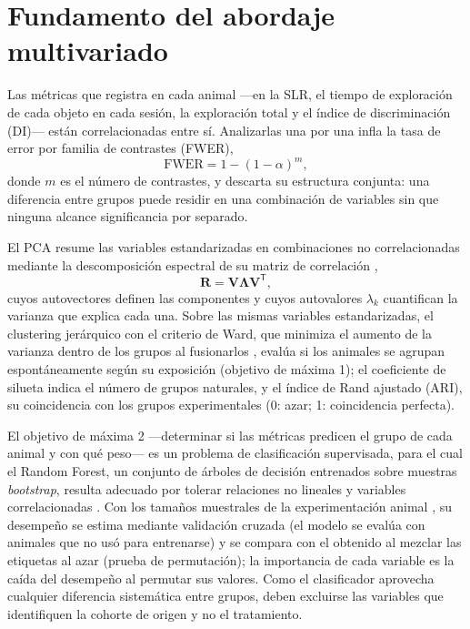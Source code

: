 \section{Fundamento del abordaje multivariado}\label{sec:multivariado}

Las métricas que \anymaze{} registra en cada animal ---en la SLR, el tiempo de exploración de cada objeto en cada sesión, la exploración total y el índice de discriminación (DI)--- están correlacionadas entre sí. Analizarlas una por una infla la tasa de error por familia de contrastes (FWER),
\begin{equation}
  \mathrm{FWER} = 1 - (1-\alpha)^{m},
  \label{eq:fwer}
\end{equation}
donde $m$ es el número de contrastes, y descarta su estructura conjunta: una diferencia entre grupos puede residir en una combinación de variables sin que ninguna alcance significancia por separado.

El PCA resume las variables estandarizadas en combinaciones no correlacionadas mediante la descomposición espectral de su matriz de correlación \cite{jolliffe2016pca},
\begin{equation}
  \mathbf{R} = \mathbf{V}\boldsymbol{\Lambda}\mathbf{V}^{\mathsf{T}},
  \label{eq:pca}
\end{equation}
cuyos autovectores definen las componentes y cuyos autovalores $\lambda_k$ cuantifican la varianza que explica cada una. Sobre las mismas variables estandarizadas, el clustering jerárquico con el criterio de Ward, que minimiza el aumento de la varianza dentro de los grupos al fusionarlos \cite{ward1963hierarchical}, evalúa si los animales se agrupan espontáneamente según su exposición (objetivo de máxima 1); el coeficiente de silueta indica el número de grupos naturales, y el índice de Rand ajustado (ARI), su coincidencia con los grupos experimentales (0: azar; 1: coincidencia perfecta).

El objetivo de máxima 2 ---determinar si las métricas predicen el grupo de cada animal y con qué peso--- es un problema de clasificación supervisada, para el cual el Random Forest, un conjunto de árboles de decisión entrenados sobre muestras \textit{bootstrap}, resulta adecuado por tolerar relaciones no lineales y variables correlacionadas \cite{breiman2001rf}. Con los tamaños muestrales de la experimentación animal \cite{charan2013sample}, su desempeño se estima mediante validación cruzada (el modelo se evalúa con animales que no usó para entrenarse) y se compara con el obtenido al mezclar las etiquetas al azar (prueba de permutación); la importancia de cada variable es la caída del desempeño al permutar sus valores. Como el clasificador aprovecha cualquier diferencia sistemática entre grupos, deben excluirse las variables que identifiquen la cohorte de origen y no el tratamiento.
